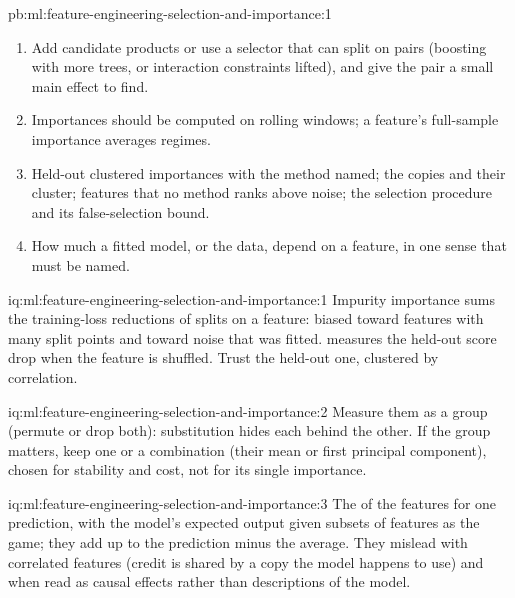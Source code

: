 \begin{solution}{pb:ml:feature-engineering-selection-and-importance:1}
\begin{enumerate}
decisions (what the model did).
\item Add candidate products or use a selector that can split on pairs (boosting with more trees, or interaction
constraints lifted), and give the pair a small main effect to find.
\item Importances should be computed on rolling windows; a feature's full-sample importance averages regimes.
\item Held-out clustered importances with the method named; the copies and their cluster; features that no method
ranks above noise; the selection procedure and its false-selection bound.
\item How much a fitted model, or the data, depend on a feature, in one sense that must be named.
\end{enumerate}
\end{solution}

\begin{solution}{iq:ml:feature-engineering-selection-and-importance:1}
Impurity importance sums the training-loss reductions of splits on a feature: biased toward features with many split
points and toward noise that was fitted.  measures the held-out score drop when the feature is
shuffled. Trust the held-out one, clustered by correlation.
\end{solution}

\begin{solution}{iq:ml:feature-engineering-selection-and-importance:2}
Measure them as a group (permute or drop both): substitution hides each behind the other. If the group matters, keep one
or a combination (their mean or first principal component), chosen for stability and cost, not for its single
importance.
\end{solution}

\begin{solution}{iq:ml:feature-engineering-selection-and-importance:3}
The  of the features for one prediction, with the model's expected output given subsets of features as
the game; they add up to the prediction minus the average. They mislead with correlated features (credit is shared by
a copy the model happens to use) and when read as causal effects rather than descriptions of the model.
\end{solution}

